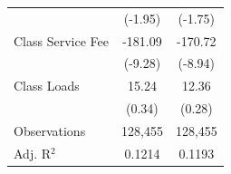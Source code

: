 {\begin{tabular}{l*{2}{c}}
                    &     (-1.95)         &     (-1.75)         \\
\addlinespace
Class Service Fee   &     -181.09\sym{***}&     -170.72\sym{***}\\
                    &     (-9.28)         &     (-8.94)         \\
\addlinespace
Class Loads         &       15.24         &       12.36         \\
                    &      (0.34)         &      (0.28)         \\
\midrule
Observations        &     128,455         &     128,455         \\
Adj. R$^{2}$        &      0.1214         &      0.1193         \\
\bottomrule
\end{tabular}
}
